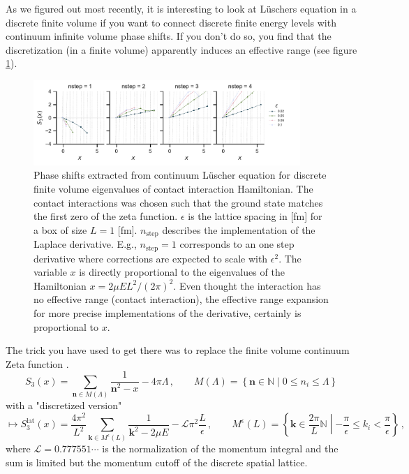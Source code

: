 \documentclass[
    aps,
    prl,
    showkeys,
    nofootinbib,
    floatfix
]{revtex4-1}
\renewcommand{\vec}[1]{\boldsymbol{#1}}
\begin{document}
As we figured out most recently, it is interesting to look at Lüschers equation in a discrete finite volume if you want to connect discrete finite energy levels with continuum infinite volume phase shifts.
If you don't do so, you find that the discretization (in a finite volume) apparently induces an effective range (see figure \ref{fig-cont-lusch}).
\begin{figure}[!htb]
\includegraphics[width=0.9\textwidth]{figs/eff-range-cont-lusch.pdf}
\caption{
    \label{fig-cont-lusch}Phase shifts extracted from continuum Lüscher equation for discrete finite volume eigenvalues of contact interaction Hamiltonian.
    The contact interactions was chosen such that the ground state matches the first zero of the zeta function.
    $\epsilon$ is the lattice spacing in [fm] for a box of size $L = 1$ [fm].
    $n_{\mathrm{step}}$ describes the implementation of the Laplace derivative.
    E.g., $n_{\mathrm{step}} = 1$ corresponds to an one step derivative where corrections are expected to scale with $\epsilon^2$.
    The variable $x$ is directly proportional to the eigenvalues of the Hamiltonian $x = 2 \mu E L^2 / (2 \pi)^2$.
    Even thought the interaction has no effective range (contact interaction), the effective range expansion for more precise implementations of the derivative, certainly is proportional to $x$.
 }
\end{figure}

The trick you have used to get there was to replace the finite volume continuum Zeta function .
\begin{equation}
    S_3(x) = \sum\limits_{\vec n \in M(\Lambda)} \frac{1}{\vec n ^2 - x} - 4 \pi \Lambda
    \, , \qquad
    M(\Lambda) = \left\{ \vec n \in \mathbb N \middle\vert 0 \leq n_i \leq \Lambda \right\}
\end{equation}
with a "discretized version"
\begin{equation}
    \mapsto
    S_3^{\mathrm{lat}}(x) = \frac{4 \pi^2}{L^2} \sum\limits_{\vec k \in M^\epsilon(L)} \frac{1}{\vec k ^2 - 2 \mu E} - \mathcal L \pi^2 \frac{L}{\epsilon}
    \, , \qquad
    M^\epsilon(L) = \left\{ \vec k \in \frac{2 \pi}{L} \mathbb N \middle\vert - \frac{\pi}{\epsilon} \leq k_i < \frac{\pi}{\epsilon} \right\}
    \, ,
\end{equation}
where $\mathcal L = 0.777551 \cdots$ is the normalization of the momentum integral and the sum is limited but the momentum cutoff of the discrete spatial lattice.
\end{document}
